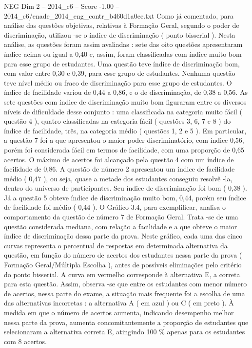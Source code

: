 \begin{textsample}{NEG Dim 2 – 2014\_c6 – Score -1.00 – 2014\_c6/enade\_2014\_eng\_contr\_b460d1a0ee.txt}
Como já comentado, para análise das questões objetivas, relativas à Formação Geral, segundo o poder de discriminação, utilizou -se o índice de discriminação ( ponto bisserial ).
Nesta análise, as questões foram assim avaliadas : sete das oito questões apresentaram índice acima ou igual a 0,40 e, assim, foram classificadas com índice muito bom para esse grupo de estudantes.
Uma questão teve índice de discriminação bom, com valor entre 0,30 e 0,39, para esse grupo de estudantes.
Nenhuma questão teve nível médio ou fraco de discriminação para esse grupo de estudantes.
O índice de facilidade variou de 0,44 a 0,86, e o de discriminação, de 0,38 a 0,56.
As sete questões com índice de discriminação muito bom figuraram entre os diversos níveis de dificuldade desse conjunto : uma classificada na categoria muito fácil ( questão 4 ), quatro classificadas na categoria fácil ( questões 3, 6, 7 e 8 ) do índice de facilidade, três, na categoria médio ( questões 1, 2 e 5 ).
Em particular, a questão 7 foi a que apresentou o maior poder discriminatório, com índice 0,56, porém foi considerada fácil em termos de facilidade, com uma proporção de 0,65 acertos.
O máximo de acertos foi alcançado pela questão 4 com um índice de facilidade de 0,86.
A questão de número 2 apresentou um índice de facilidade médio ( 0,47 ), ou seja, quase a metade dos estudantes conseguiu resolvê -la, dentro do universo de participantes.
Seu índice de discriminação foi bom ( 0,38 ).
Já a questão 5 obteve índice de discriminação muito bom, 0,44, porém seu índice de facilidade foi médio ( 0,44 ).
O Gráfico 3.4, para exemplificar, analisa o comportamento da questão de número 7 de Formação Geral.
Trata -se de uma questão considerada mediana, com relação a facilidade e a que obteve o maior índice de discriminação dessa parte da prova.
Neste gráfico, cada uma das cinco curvas representa o percentual de respostas em determinada alternativa da questão, em função do número de acertos dos estudantes nessa parte da prova ( Formação Geral/Múltipla Escolha ), antes de possíveis eliminações pelo critério do ponto bisserial.
A curva em vermelho corresponde à alternativa E, a correta para esta questão.
Assim, observa -se que entre os estudantes com menor número de acertos, nessa parte do exame, a situação mais frequente foi a escolha de uma das alternativas incorretas : a alternativa A ( em azul ) ou C ( em preto ).
À medida em que o número de acertos aumenta, indicando desempenho melhor nessa parte da prova, aumenta concomitantemente a proporção de estudantes que selecionaram a alternativa correta E, atingindo 100 \% apenas para os estudantes com 8 acertos.

\end{textsample}
